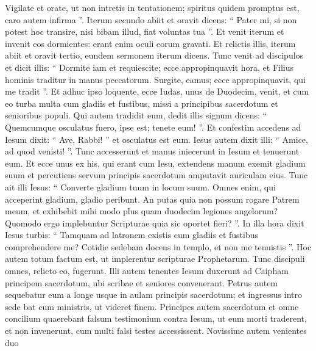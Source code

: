 \begin{biblechapter}
\begin{biblechapter}
\begin{biblechapter}
\begin{biblechapter}
\begin{biblechapter}
\begin{biblechapter}
\begin{biblechapter}
\begin{biblechapter}
\begin{biblechapter}
\begin{biblechapter}
\begin{biblechapter}
\begin{biblechapter}
\begin{biblechapter}
\begin{biblechapter}
\begin{biblechapter}
\begin{biblechapter}
\begin{biblechapter}
\begin{biblechapter}
\begin{biblechapter}
\begin{biblechapter}
\begin{biblechapter}
\begin{biblechapter}
\begin{biblechapter}
\begin{biblechapter}
\begin{biblechapter}
\begin{biblechapter}
\verse Vigilate et orate, ut non intretis in tentationem; spiritus quidem promptus est, caro autem infirma ”. 
\verse Iterum secundo abiit et oravit dicens: “ Pater mi, si non potest hoc transire, nisi bibam illud, fiat voluntas tua ”. 
\verse Et venit iterum et invenit eos dormientes: erant enim oculi eorum gravati. 
\verse Et relictis illis, iterum abiit et oravit tertio, eundem sermonem iterum dicens. 
 \verse Tunc venit ad discipulos et dicit illis: “ Dormite iam et requiescite; ecce appropinquavit hora, et Filius hominis traditur in manus peccatorum. 
\verse Surgite, eamus; ecce appropinquavit, qui me tradit ”.
 \verse Et adhuc ipso loquente, ecce Iudas, unus de Duodecim, venit, et cum eo turba multa cum gladiis et fustibus, missi a principibus sacerdotum et senioribus populi. 
\verse Qui autem tradidit eum, dedit illis signum dicens: “ Quemcumque osculatus fuero, ipse est; tenete eum! ”. 
\verse Et confestim accedens ad Iesum dixit: “ Ave, Rabbi! ” et osculatus est eum. 
\verse Iesus autem dixit illi: “ Amice, ad quod venisti! ”. Tunc accesserunt et manus iniecerunt in Iesum et tenuerunt eum. 
\verse Et ecce unus ex his, qui erant cum Iesu, extendens manum exemit gladium suum et percutiens servum principis sacerdotum amputavit auriculam eius.
 \verse Tunc ait illi Iesus: “ Converte gladium tuum in locum suum. Omnes enim, qui acceperint gladium, gladio peribunt. 
\verse An putas quia non possum rogare Patrem meum, et exhibebit mihi modo plus quam duodecim legiones angelorum? 
 \verse Quomodo ergo implebuntur Scripturae quia sic oportet fieri? ”. 
\verse In illa hora dixit Iesus turbis: “ Tamquam ad latronem existis cum gladiis et fustibus comprehendere me? Cotidie sedebam docens in templo, et non me tenuistis ”. 
 \verse Hoc autem totum factum est, ut implerentur scripturae Prophetarum. Tunc discipuli omnes, relicto eo, fugerunt.
 \verse Illi autem tenentes Iesum duxerunt ad Caipham principem sacerdotum, ubi scribae et seniores convenerant. 
\verse Petrus autem sequebatur eum a longe usque in aulam principis sacerdotum; et ingressus intro sede bat cum ministris, ut videret finem. 
\verse Principes autem sacerdotum et omne concilium quaerebant falsum testimonium contra Iesum, ut eum morti traderent, 
\verse et non invenerunt, cum multi falsi testes accessissent. Novissime autem venientes duo 

\end{biblechapter}
\end{biblechapter}
\end{biblechapter}
\end{biblechapter}
\end{biblechapter}
\end{biblechapter}
\end{biblechapter}
\end{biblechapter}
\end{biblechapter}
\end{biblechapter}
\end{biblechapter}
\end{biblechapter}
\end{biblechapter}
\end{biblechapter}
\end{biblechapter}
\end{biblechapter}
\end{biblechapter}
\end{biblechapter}
\end{biblechapter}
\end{biblechapter}
\end{biblechapter}
\end{biblechapter}
\end{biblechapter}
\end{biblechapter}
\end{biblechapter}
\end{biblechapter}
